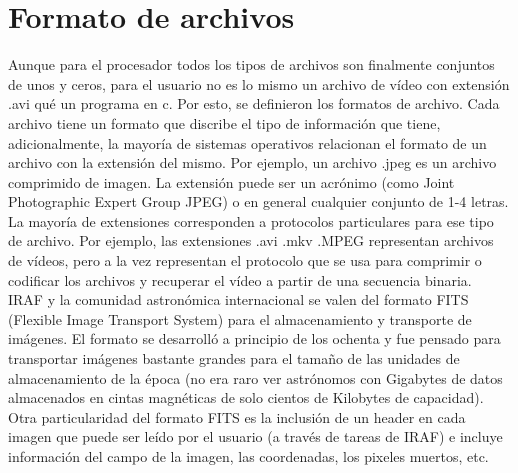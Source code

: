 \documentclass[12pt]{article}
\begin{document}
\section{Formato de archivos}
Aunque para el procesador todos los tipos de archivos son finalmente conjuntos de unos y ceros, para el usuario no es lo mismo un archivo de vídeo con extensión .avi qué un programa en c. Por esto, se definieron los formatos de archivo. Cada archivo tiene un formato que discribe el tipo de información que tiene, adicionalmente, la mayoría de sistemas operativos relacionan el formato de un archivo con la extensión del mismo. Por ejemplo, un archivo .jpeg es un archivo comprimido de imagen. La extensión puede ser un acrónimo (como Joint Photographic Expert Group JPEG) o en general cualquier conjunto de 1-4 letras. La mayoría de extensiones corresponden a protocolos particulares para ese tipo de archivo. Por ejemplo, las extensiones .avi .mkv .MPEG representan archivos de vídeos, pero a la vez representan el protocolo que se usa para comprimir o codificar los archivos y recuperar el vídeo a partir de una secuencia binaria.\\
IRAF y la comunidad astronómica internacional se valen del formato FITS (Flexible Image Transport System) para el almacenamiento y transporte de imágenes. El formato se desarrolló a principio de los ochenta y fue pensado para transportar imágenes bastante grandes para el tamaño de las unidades de almacenamiento de la época (no era raro ver astrónomos con Gigabytes de datos almacenados en cintas magnéticas de solo cientos de Kilobytes de capacidad). Otra particularidad del formato FITS es la inclusión de un header en cada imagen que puede ser leído por el usuario (a través de tareas de IRAF) e incluye información del campo de la imagen, las coordenadas, los pixeles muertos, etc. 
\end{document}
